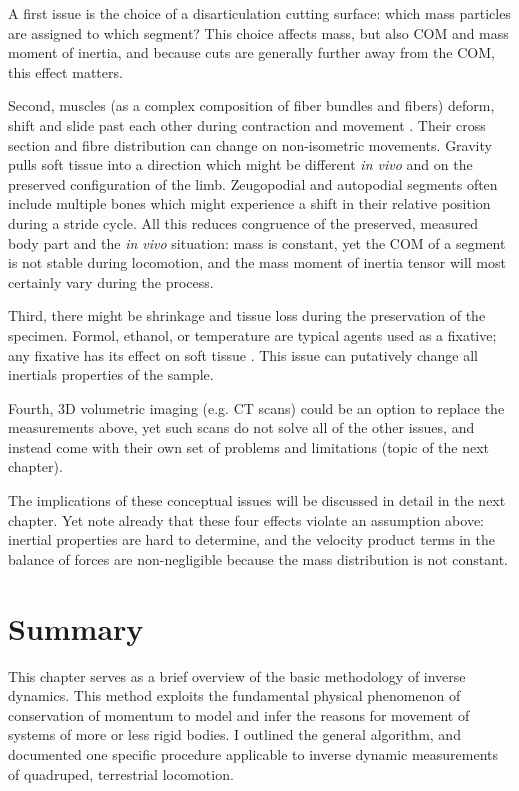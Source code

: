 A first issue is the choice of a disarticulation cutting surface: which mass particles are assigned to which segment?
This choice affects mass, but also COM and mass moment of inertia, and because cuts are generally further away from the COM, this effect matters.

Second, muscles (as a complex composition of fiber bundles and fibers) deform, shift and slide past each other during contraction and movement \citep{Bol2013}.
Their cross section and fibre distribution can change on non-isometric movements.
Gravity pulls soft tissue into a direction \citep{Hansraj2022} which might be different \emph{in vivo} and on the preserved configuration of the limb.
Zeugopodial and autopodial segments often include multiple bones which might experience a shift in their relative position during a stride cycle.
All this reduces congruence of the preserved, measured body part and the \emph{in vivo} situation: mass is constant, yet the COM of a segment is not stable during locomotion, and the mass moment of inertia tensor will most certainly vary during the process.

Third, there might be shrinkage and tissue loss during the preservation of the specimen.
Formol, ethanol, or temperature are typical agents used as a fixative; any fixative has its effect on soft tissue \citep{Buytaert2014,Pech1987}.
This issue can putatively change all inertials properties of the sample.

Fourth, 3D volumetric imaging (e.g. CT scans) could be an option to replace the measurements above, yet such scans do not solve all of the other issues, and instead come with their own set of problems and limitations (topic of the next chapter).



The implications of these conceptual issues will be discussed in detail in the next chapter.
Yet note already that these four effects violate an assumption above: inertial properties are hard to determine, and the velocity product terms in the balance of forces are non-negligible because the mass distribution is not constant.


\clearpage
\section{Summary}
\label{sec:orgd0ffc38}
This chapter serves as a brief overview of the basic methodology of inverse dynamics.
This method exploits the fundamental physical phenomenon of conservation of momentum to model and infer the reasons for movement of systems of more or less rigid bodies.
I outlined the general algorithm, and documented one specific procedure applicable to inverse dynamic measurements of quadruped, terrestrial locomotion.



